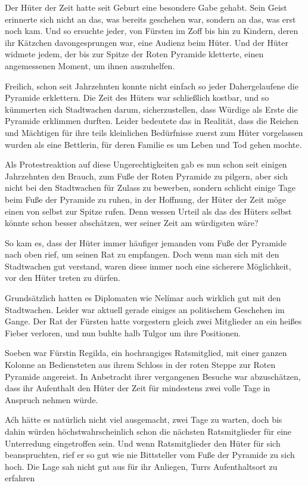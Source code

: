 Der Hüter der Zeit hatte seit Geburt eine besondere Gabe gehabt. Sein Geist erinnerte sich nicht an das, was bereits geschehen war, sondern an das, was erst noch kam. Und so ersuchte jeder, von Fürsten im Zoff bis hin zu Kindern, deren ihr Kätzchen davongesprungen war, eine Audienz beim Hüter. Und der Hüter widmete jedem, der bis zur Spitze der Roten Pyramide kletterte, einen angemessenen Moment, um ihnen auszuhelfen.

Freilich, schon seit Jahrzehnten konnte nicht einfach so jeder Dahergelaufene die Pyramide erklettern. Die Zeit des Hüters war schließlich kostbar, und so kümmerten sich Stadtwachen darum, sicherzustellen, dass Würdige als Erste die Pyramide erklimmen durften. Leider bedeutete das in Realität, dass die Reichen und Mächtigen für ihre teils kleinlichen Bedürfnisse zuerst zum Hüter vorgelassen wurden als eine Bettlerin, für deren Familie es um Leben und Tod gehen mochte.

Als Protestreaktion auf diese Ungerechtigkeiten gab es nun schon seit einigen Jahrzehnten den Brauch, zum Fuße der Roten Pyramide zu pilgern, aber sich nicht bei den Stadtwachen für Zulass zu bewerben, sondern schlicht einige Tage beim Fuße der Pyramide zu ruhen, in der Hoffnung, der Hüter der Zeit möge einen von selbst zur Spitze rufen. Denn wessen Urteil als das des Hüters selbst könnte schon besser abschätzen, wer seiner Zeit am würdigsten wäre?

So kam es, dass der Hüter immer häufiger jemanden vom Fuße der Pyramide nach oben rief, um seinen Rat zu empfangen. Doch wenn man sich mit den Stadtwachen gut verstand, waren diese immer noch eine sicherere Möglichkeit, vor den Hüter treten zu dürfen.

Grundsätzlich hatten es Diplomaten wie Nelímar auch wirklich gut mit den Stadtwachen. Leider war aktuell gerade einiges an politischem Geschehen im Gange. Der Rat der Fürsten hatte vorgestern gleich zwei Mitglieder an ein heißes Fieber verloren, und nun buhlte halb Tulgor um ihre Positionen.

Soeben war Fürstin Regilda, ein hochrangiges Ratsmitglied, mit einer ganzen Kolonne an Bediensteten aus ihrem Schloss in der roten Steppe zur Roten Pyramide angereist. In Anbetracht ihrer vergangenen Besuche war abzuschätzen, dass ihr Aufenthalt den Hüter der Zeit für mindestens zwei volle Tage in Anspruch nehmen würde.

Aćh hätte es natürlich nicht viel ausgemacht, zwei Tage zu warten, doch bis dahin würden höchstwahrscheinlich schon die nächsten Ratsmitglieder für eine Unterredung eingetroffen sein. Und wenn Ratsmitglieder den Hüter für sich beanspruchten, rief er so gut wie nie Bittsteller vom Fuße der Pyramide zu sich hoch. Die Lage sah nicht gut aus für ihr Anliegen, Turrs Aufenthaltsort zu erfahren

